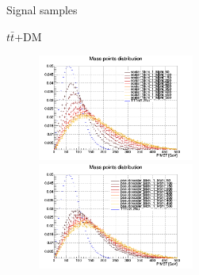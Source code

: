 \documentclass[8pt]{beamer}
\begin{document}
\begin{frame}{Signal samples}
\vspace{-5pt}
\begin{block}{\centering $t \bar t$+DM}\end{block} \vspace{-10pt}
\begin{figure}[htbp]
\centering
\begin{minipage}[b]{.49\textwidth}
\begin{center}
\includegraphics[width=5.2cm, height=3.5cm]{figs/scalarMETmChi1Norm.png}
\end{center}
\end{minipage}\hfill
\begin{minipage}[b]{.49\textwidth}
\begin{center}
\includegraphics[width=5.2cm, height=3.5cm]{figs/pseudoscalarMETmChi1Norm.png}
\end{center}
\end{minipage} \hfill
\end{figure} \vfill
\end{frame}
\end{document}
